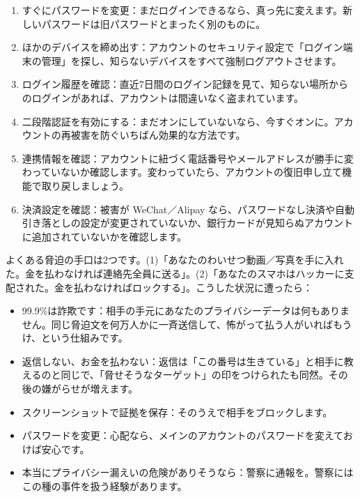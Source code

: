 
\begin{enumerate}
  \item すぐにパスワードを変更：まだログインできるなら、真っ先に変えます。新しいパスワードは旧パスワードとまったく別のものに。
  \item ほかのデバイスを締め出す：アカウントのセキュリティ設定で「ログイン端末の管理」を探し、知らないデバイスをすべて強制ログアウトさせます。
  \item ログイン履歴を確認：直近7日間のログイン記録を見て、知らない場所からのログインがあれば、アカウントは間違いなく盗まれています。
  \item 二段階認証を有効にする：まだオンにしていないなら、今すぐオンに。アカウントの再被害を防ぐいちばん効果的な方法です。
  \item 連携情報を確認：アカウントに紐づく電話番号やメールアドレスが勝手に変わっていないか確認します。変わっていたら、アカウントの復旧申し立て機能で取り戻しましょう。
  \item 決済設定を確認：被害が WeChat／Alipay なら、パスワードなし決済や自動引き落としの設定が変更されていないか、銀行カードが見知らぬアカウントに追加されていないかを確認します。
\end{enumerate}


よくある脅迫の手口は2つです。(1)「あなたのわいせつ動画／写真を手に入れた。金を払わなければ連絡先全員に送る」。(2)「あなたのスマホはハッカーに支配された。金を払わなければロックする」。こうした状況に遭ったら：

\begin{itemize}
  \item 99.9\%は詐欺です：相手の手元にあなたのプライバシーデータは何もありません。同じ脅迫文を何万人かに一斉送信して、怖がって払う人がいればもうけ、という仕組みです。
  \item 返信しない、お金を払わない：返信は「この番号は生きている」と相手に教えるのと同じで、「脅せそうなターゲット」の印をつけられたも同然。その後の嫌がらせが増えます。
  \item スクリーンショットで証拠を保存：そのうえで相手をブロックします。
  \item パスワードを変更：心配なら、メインのアカウントのパスワードを変えておけば安心です。
  \item 本当にプライバシー漏えいの危険がありそうなら：警察に通報を。警察にはこの種の事件を扱う経験があります。
\end{itemize}

